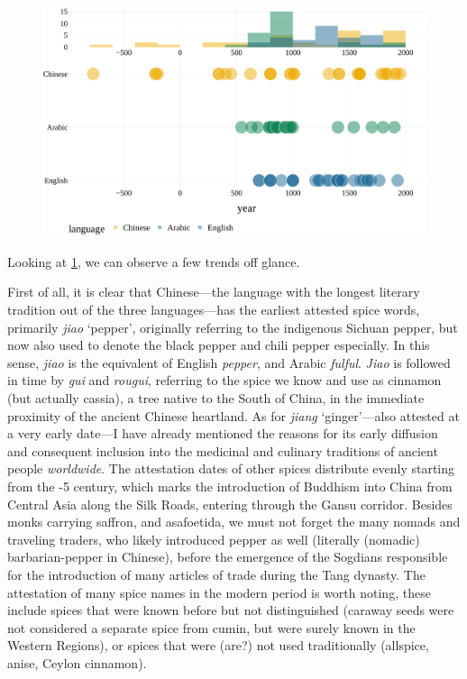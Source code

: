 
\begin{figure}[!ht]
  \centering
  \includegraphics[width=\linewidth]{imgs/plots/attestation_compact.pdf}
  \caption{}
  \label{fig:attestation_compact}
\end{figure}

Looking at \cref{fig:attestation_compact}, we can observe a few trends off glance. 

First of all, it is clear that Chinese---the language with the longest literary tradition out of the three languages---has the earliest attested spice words, primarily \textit{jiao} `pepper', originally referring to the indigenous Sichuan pepper, but now also used to denote the black pepper and chili pepper especially. In this sense, \textit{jiao} is the equivalent of English \textit{pepper}, and Arabic \textit{fulful}. \textit{Jiao} is followed in time by \textit{gui} and \textit{rougui}, referring to the spice we know and use as cinnamon (but actually cassia), a tree native to the South of China, in the immediate proximity of the ancient Chinese heartland. As for \textit{jiang} `ginger'---also attested at a very early date---I have already mentioned the reasons for its early diffusion and consequent inclusion into the medicinal and culinary traditions of ancient people \textit{worldwide}. The attestation dates of other spices distribute evenly starting from the -{5} century, which marks the introduction of Buddhism into China from Central Asia along the Silk Roads, entering through the Gansu corridor. Besides monks carrying saffron, and asafoetida, we must not forget the many nomads and traveling traders, who likely introduced pepper as well (literally (nomadic) barbarian-pepper in Chinese), before the emergence of the Sogdians responsible for the introduction of many articles of trade during the Tang dynasty. 
The attestation of many spice names in the modern period is worth noting, these include spices that were known before but not distinguished (caraway seeds were not considered a separate spice from cumin, but were surely known in the Western Regions), or spices that were (are?) not used traditionally (allspice, anise, Ceylon cinnamon).

